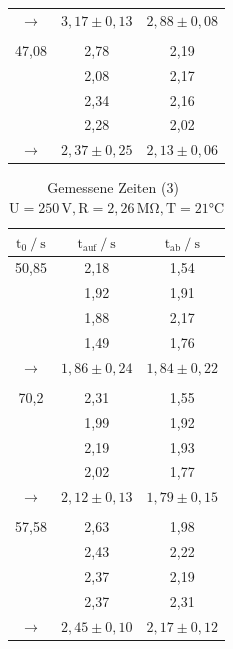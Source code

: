 \begin{table} [H]
\begin{subtable}[c]{0.5\textwidth}
\begin{tabular}{ c|c|c}
            \rowcolor{gray}$\to$ & $3,17 \pm 0,13$ & $2,88 \pm 0,08$ \\
                &  &  \\
            47,08 & 2,78 & 2,19 \\
                & 2,08 & 2,17 \\
                & 2,34 & 2,16 \\
                & 2,28 & 2,02 \\
            \rowcolor{gray}$\to$ & $2,37 \pm 0,25$ & $2,13 \pm 0,06$ \\
        \bottomrule
        \end{tabular}
        \end{subtable}
\end{table}


\begin{table}[H]
    \caption{Gemessene Zeiten (3) \, $\text{U} = 250\,\text{V}, \text{R} = 2,26\,\unit{\mega\ohm}, \text{T} = 21\unit{\celsius}  $}
    \label{Tabelle7}
    \centering
    \begin{tabular}{ c|c|c}
        \toprule
        {$\text{t}_{0} \mathbin{/}\unit{\second} $}&
        {$\text{t}_{\text{auf}} \mathbin{/}\unit{\second} $}&
        {$\text{t}_{\text{ab}} \mathbin{/}\unit{\second} $}\\
        \midrule
        50,85  & 2,18 & 1,54 \\
            & 1,92 & 1,91 \\
            & 1,88 & 2,17 \\
            & 1,49 & 1,76 \\
        \rowcolor{gray}$\to$ & $1,86 \pm 0,24$ & $1,84 \pm 0,22$ \\
            &  &  \\
        70,2 & 2,31 & 1,55\\
            & 1,99 & 1,92 \\
            & 2,19 & 1,93 \\
            & 2,02 & 1,77 \\
        \rowcolor{gray}$\to$ & $2,12 \pm 0,13$ & $1,79 \pm 0,15$ \\
            &  &  \\
        57,58 & 2,63 & 1,98 \\
            & 2,43 & 2,22 \\
            & 2,37 & 2,19 \\
            & 2,37 & 2,31 \\
        \rowcolor{gray}$\to$ & $2,45 \pm 0,10$ & $2,17 \pm 0,12$ \\

\end{tabular}
\end{table}
